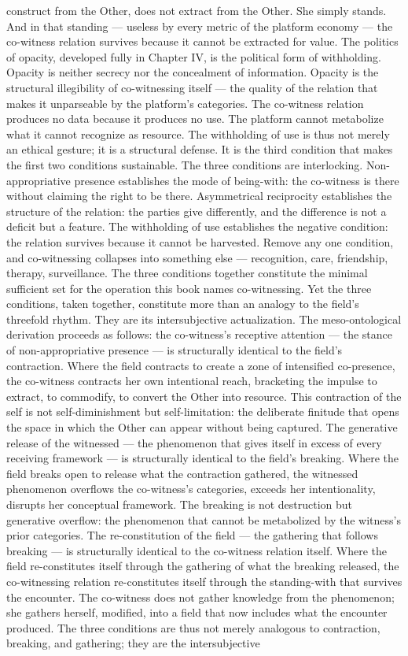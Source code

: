 construct from the Other, does not extract from the Other. She simply stands. And in that standing — useless by every metric of the platform economy — the co-witness relation survives because it cannot be extracted for value. The politics of opacity, developed fully in Chapter IV, is the political form of withholding. Opacity is neither secrecy nor the concealment of information. Opacity is the structural illegibility of co-witnessing itself — the quality of the relation that makes it unparseable by the platform’s categories. The co-witness relation produces no data because it produces no use. The platform cannot metabolize what it cannot recognize as resource. The withholding of use is thus not merely an ethical gesture; it is a structural defense. It is the third condition that makes the first two conditions sustainable. The three conditions are interlocking. Non-appropriative presence establishes the mode of being-with: the co-witness is there without claiming the right to be there. Asymmetrical reciprocity establishes the structure of the relation: the parties give differently, and the difference is not a deficit but a feature. The withholding of use establishes the negative condition: the relation survives because it cannot be harvested. Remove any one condition, and co-witnessing collapses into something else — recognition, care, friendship, therapy, surveillance. The three conditions together constitute the minimal sufficient set for the operation this book names co-witnessing. Yet the three conditions, taken together, constitute more than an analogy to the field’s threefold rhythm. They are its intersubjective actualization. The meso-ontological derivation proceeds as follows: the co-witness’s receptive attention — the stance of non-appropriative presence — is structurally identical to the field’s contraction. Where the field contracts to create a zone of intensified co-presence, the co-witness contracts her own intentional reach, bracketing the impulse to extract, to commodify, to convert the Other into resource. This contraction of the self is not self-diminishment but self-limitation: the deliberate finitude that opens the space in which the Other can appear without being captured. The generative release of the witnessed — the phenomenon that gives itself in excess of every receiving framework — is structurally identical to the field’s breaking. Where the field breaks open to release what the contraction gathered, the witnessed phenomenon overflows the co-witness’s categories, exceeds her intentionality, disrupts her conceptual framework. The breaking is not destruction but generative overflow: the phenomenon that cannot be metabolized by the witness’s prior categories. The re-constitution of the field — the gathering that follows breaking — is structurally identical to the co-witness relation itself. Where the field re-constitutes itself through the gathering of what the breaking released, the co-witnessing relation re-constitutes itself through the standing-with that survives the encounter. The co-witness does not gather knowledge from the phenomenon; she gathers herself, modified, into a field that now includes what the encounter produced. The three conditions are thus not merely analogous to contraction, breaking, and gathering; they are the intersubjective 
